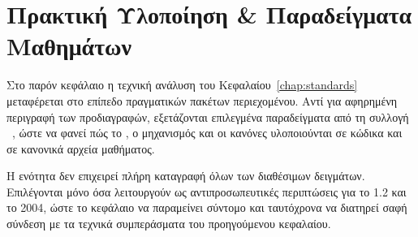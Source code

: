 \chapter{Πρακτική Υλοποίηση \& Παραδείγματα Μαθημάτων}
\label{chap:implementation}

Στο παρόν κεφάλαιο η τεχνική ανάλυση του Κεφαλαίου~\ref{chap:standards} μεταφέρεται στο επίπεδο πραγματικών πακέτων περιεχομένου. Αντί για αφηρημένη περιγραφή των προδιαγραφών, εξετάζονται επιλεγμένα παραδείγματα από τη συλλογή ~\cite{SCORMGolfExamples}, ώστε να φανεί πώς το , ο μηχανισμός  και οι κανόνες  υλοποιούνται σε κώδικα και σε κανονικά αρχεία μαθήματος.

Η ενότητα δεν επιχειρεί πλήρη καταγραφή όλων των διαθέσιμων δειγμάτων. Επιλέγονται μόνο όσα λειτουργούν ως αντιπροσωπευτικές περιπτώσεις για το  1.2 και το  2004, ώστε το κεφάλαιο να παραμείνει σύντομο και ταυτόχρονα να διατηρεί σαφή σύνδεση με τα τεχνικά συμπεράσματα του προηγούμενου κεφαλαίου.




